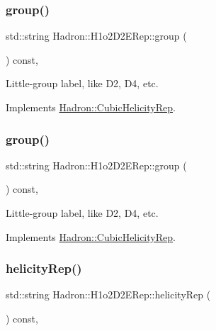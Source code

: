 \subsubsection{\texorpdfstring{group()}{group()}\hspace{0.1cm}{\footnotesize\ttfamily [2/3]}}
{\footnotesize\ttfamily std\+::string Hadron\+::\+H1o2\+D2\+E\+Rep\+::group (\begin{DoxyParamCaption}{ }\end{DoxyParamCaption}) const\hspace{0.3cm}{\ttfamily [inline]}, {\ttfamily [virtual]}}

Little-\/group label, like D2, D4, etc. 

Implements \mbox{\hyperlink{structHadron_1_1CubicHelicityRep_a101a7d76cd8ccdad0f272db44b766113}{Hadron\+::\+Cubic\+Helicity\+Rep}}.

\mbox{\label{structHadron_1_1H1o2D2ERep_a932070dfad7ef632122da818917b4fcc}} 
\subsubsection{\texorpdfstring{group()}{group()}\hspace{0.1cm}{\footnotesize\ttfamily [3/3]}}
{\footnotesize\ttfamily std\+::string Hadron\+::\+H1o2\+D2\+E\+Rep\+::group (\begin{DoxyParamCaption}{ }\end{DoxyParamCaption}) const\hspace{0.3cm}{\ttfamily [inline]}, {\ttfamily [virtual]}}

Little-\/group label, like D2, D4, etc. 

Implements \mbox{\hyperlink{structHadron_1_1CubicHelicityRep_a101a7d76cd8ccdad0f272db44b766113}{Hadron\+::\+Cubic\+Helicity\+Rep}}.

\mbox{\label{structHadron_1_1H1o2D2ERep_a8c9ee9d587a013968ba36b769ddccfc3}} 
\subsubsection{\texorpdfstring{helicityRep()}{helicityRep()}\hspace{0.1cm}{\footnotesize\ttfamily [1/2]}}
{\footnotesize\ttfamily std\+::string Hadron\+::\+H1o2\+D2\+E\+Rep\+::helicity\+Rep (\begin{DoxyParamCaption}{ }\end{DoxyParamCaption}) const\hspace{0.3cm}{\ttfamily [inline]}, {\ttfamily [virtual]}}

